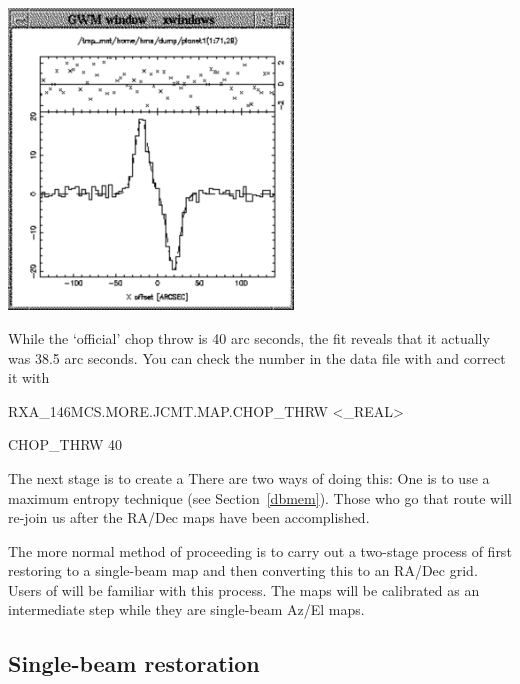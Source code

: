 \documentclass[11pt,noabs]{starlink}
\begin{document}
\begin{center}
\leavevmode\includegraphics[height=80mm]{sc1_fitgauss}
\end{center}

   While the `official' chop throw is 40 arc seconds, the fit reveals that
   it actually was 38.5 arc seconds.
   You can check the number in the data file with
\texttt{}
   and correct it with
\texttt{}

\begin{terminalv}

RXA_146MCS.MORE.JCMT.MAP.CHOP_THRW  <_REAL>

  CHOP_THRW      40

\end{terminalv}



   The next stage is to create a
   There are two ways of doing this: One is to use a
   maximum entropy technique
(see Section~\ref{dbmem}).
   Those who go that route will re-join us
   after the RA/Dec maps have been accomplished.

   The more normal method of proceeding
   is to carry out a two-stage process of first restoring to a single-beam map
   and then converting this to an RA/Dec grid. Users of
   will be familiar with this process. The maps will be calibrated as an
   intermediate step while they are single-beam Az/El maps.


\subsection{\label{restore}Single-beam restoration}
\end{document}
